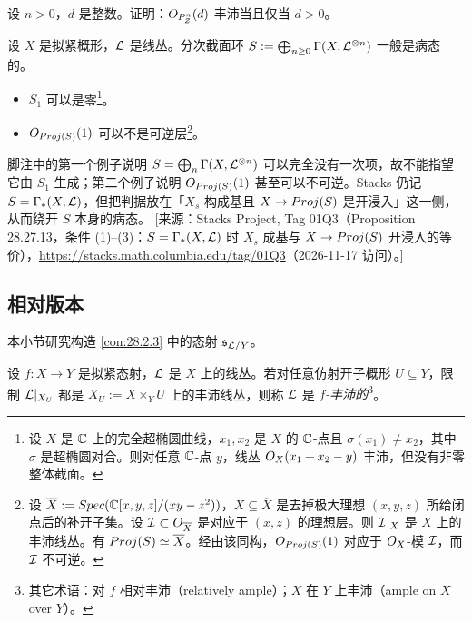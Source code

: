 \begin{exercise}\label{exc:28.3.8}
设 $n>0$，$d$ 是整数。证明：$O_{P^n_{Z}}(d)$ 丰沛当且仅当 $d>0$。
\end{exercise}

\begin{warning}\label{warn:28.3.9}
设 $X$ 是拟紧概形，$\mathcal{L}$ 是线丛。分次截面环 $S:=\bigoplus_{n\ge 0}\Gamma(X,\mathcal{L}^{\otimes n})$ 一般是病态的。
\begin{itemize}[leftmargin=1.6em,itemsep=0.2ex]
  \item $S_1$ 可以是零\footnote{设 $X$ 是 $\mathbb{C}$ 上的完全超椭圆曲线，$x_1,x_2$ 是 $X$ 的 $\mathbb{C}$-点且 $\sigma(x_1)\neq x_2$，其中 $\sigma$ 是超椭圆对合。则对任意 $\mathbb{C}$-点 $y$，线丛 $O_X(x_1+x_2-y)$ 丰沛，但没有非零整体截面。}。
  \item $O_{Proj(S)}(1)$ 可以不是可逆层\footnote{设 $\overline X:=Spec(\mathbb{C}[x,y,z]/(xy-z^2))$，$X\subseteq\overline X$ 是去掉极大理想 $(x,y,z)$ 所给闭点后的补开子集。设 $\mathcal{I}\subset O_{\overline X}$ 是对应于 $(x,z)$ 的理想层。则 $\mathcal{I}|_X$ 是 $X$ 上的丰沛线丛。有 $Proj(S)\simeq\overline X$。经由该同构，$O_{Proj(S)}(1)$ 对应于 $O_X$-模 $\mathcal{I}$，而 $\mathcal{I}$ 不可逆。}。
\end{itemize}
\end{warning}

\begin{yizhu}
脚注中的第一个例子说明 $S=\bigoplus_n\Gamma(X,\mathcal{L}^{\otimes n})$ 可以完全没有一次项，故不能指望它由 $S_1$ 生成；第二个例子说明 $O_{Proj(S)}(1)$ 甚至可以不可逆。Stacks 仍记 $S=\Gamma_*(X,\mathcal{L})$，但把判据放在「$X_s$ 构成基且 $X\to Proj(S)$ 是开浸入」这一侧，从而绕开 $S$ 本身的病态。
[来源：Stacks Project, Tag 01Q3（Proposition 28.27.13，条件 (1)–(3)：$S=\Gamma_*(X,\mathcal{L})$ 时 $X_s$ 成基与 $X\to Proj(S)$ 开浸入的等价），\url{https://stacks.math.columbia.edu/tag/01Q3}（2026-11-17 访问）。]
\end{yizhu}

\subsection{相对版本}\label{sec:28.4}

本小节研究构造 \ref{con:28.2.3} 中的态射 $\mathfrak s_{\mathcal{L}/Y}$。

\begin{definition}\label{def:28.4.1}
设 $f\colon X\to Y$ 是拟紧态射，$\mathcal{L}$ 是 $X$ 上的线丛。若对任意仿射开子概形 $U\subseteq Y$，限制 $\mathcal{L}|_{X_U}$ 都是 $X_U:=X\times_Y U$ 上的丰沛线丛，则称 $\mathcal{L}$ 是 \emph{$f$-丰沛的}\footnote{其它术语：对 $f$ 相对丰沛（relatively ample）；$X$ 在 $Y$ 上丰沛（ample on $X$ over $Y$）。}。
\end{definition}

